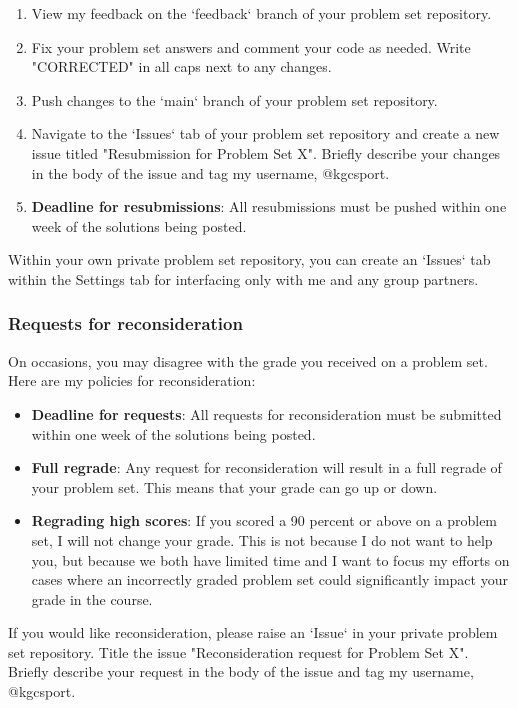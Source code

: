 \documentclass[11pt]{article}
\begin{document}
\begin{enumerate}
\item View my feedback on the `feedback` branch of your problem set repository. 
\item Fix your problem set answers and comment your code as needed. Write "CORRECTED" in all caps next to any changes. 
\item Push changes to the `main` branch of your problem set repository.
\item Navigate to the `Issues` tab of your problem set repository and create a new issue titled "Resubmission for Problem Set X". Briefly describe your changes in the body of the issue and tag my username, @kgcsport. 
\item \textbf{Deadline for resubmissions}: All resubmissions must be pushed within one week of the solutions being posted.
\end{enumerate}
Within your own private problem set repository, you can create an `Issues` tab within the Settings tab for interfacing only with me and any group partners.

\subsubsection*{Requests for reconsideration}

On occasions, you may disagree with the grade you received on a problem set. Here are my policies for reconsideration:

\begin{itemize}
\item \textbf{Deadline for requests}: All requests for reconsideration must be submitted within one week of the solutions being posted.
\item \textbf{Full regrade}: Any request for reconsideration will result in a full regrade of your problem set. This means that your grade can go up or down.
\item \textbf{Regrading high scores}: If you scored a 90 percent or above on a problem set, I will not change your grade. This is not because I do not want to help you, but because we both have limited time and I want to focus my efforts on cases where an incorrectly graded problem set could significantly impact your grade in the course. 
\end{itemize}

If you would like reconsideration, please raise an `Issue` in your private problem set repository. Title the issue "Reconsideration request for Problem Set X". Briefly describe your request in the body of the issue and tag my username, @kgcsport. 
\end{document}
